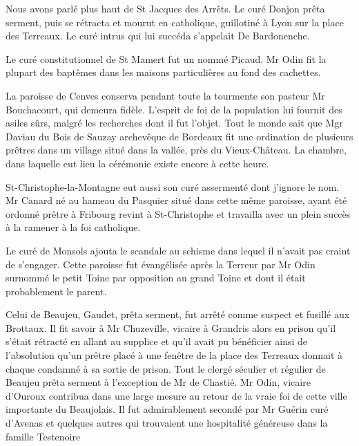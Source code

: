 \par

Nous avons parlé plus haut de St Jacques des Arrêts. Le curé Donjon prêta serment, puis se rétracta et mourut en catholique, guillotiné à Lyon sur la place des Terreaux. Le curé intrus qui lui succéda s'appelait De Bardonenche.

Le curé constitutionnel de St 
Mamert fut un nommé Picaud. Mr Odin fit la plupart des baptêmes dans les maisons particulières au fond des cachettes.

La paroisse de Cenves conserva pendant toute la tourmente son pasteur Mr Bouchacourt, qui demeura fidèle. L'esprit de foi de la population lui fournit des asiles sûrs, malgré les recherches dont il fut l'objet. Tout le monde sait que Mgr Daviau du Bois de Sauzay archevêque de Bordeaux fit une ordination de plusieurs prêtres dans un village situé dans la vallée, près du Vieux-Château. La chambre, dans laquelle eut lieu la cérémonie existe encore à cette heure.

St-Christophe-la-Montagne eut aussi son curé assermenté dont j'ignore le nom. Mr Canard né au hameau du Pasquier situé dans cette même paroisse, ayant été ordonné prêtre à Fribourg revint à St-Christophe et travailla avec un plein succès à la ramener à la foi catholique.

Le curé de Monsols ajouta le scandale au schisme dans lequel il n'avait pas craint de s'engager. Cette paroisse fut évangélisée après la Terreur par Mr Odin surnommé le petit Toine par opposition au grand Toine et dont il était probablement le parent.

Celui de Beaujeu, Gaudet, prêta serment, fut arrêté comme suspect et fusillé aux Brottaux. Il fit savoir à Mr Chuzeville, vicaire à Grandris alors en prison qu'il s'était rétracté en allant au supplice et qu'il avait pu bénéficier ainsi de l'absolution qu'un prêtre placé à une fenêtre de la place des Terreaux donnait à chaque condamné à sa sortie de prison. Tout le clergé séculier et régulier de Beaujeu prêta serment à l'exception de Mr de Chastié. Mr Odin, vicaire d'Ouroux contribua dans une large mesure au retour de la vraie foi de cette ville importante du Beaujolais. Il fut admirablement secondé par Mr Guérin curé d'Avenas et quelques autres qui trouvaient une hospitalité généreuse dans la famille Testenoire

